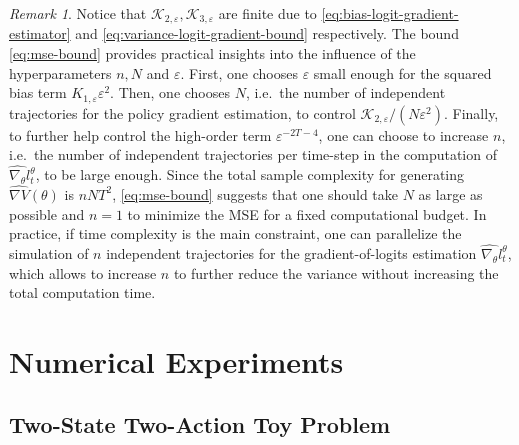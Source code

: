 \documentclass[11pt]{article}
\numberwithin{equation}{section}
\theoremstyle{definition}
\theoremstyle{remark}
\newtheorem{remark}{Remark}[section]
\def\eps{\varepsilon}
\begin{document}
\begin{remark}
    \label{remark:asymptotic-bound-mse}
    Notice that $\mathcal K_{2, \eps}, \mathcal K_{3, \eps}$ are finite due to \eqref{eq:bias-logit-gradient-estimator} and \eqref{eq:variance-logit-gradient-bound} respectively.
    The bound \eqref{eq:mse-bound} provides practical insights into the influence of the hyperparameters $n,N$ and $\eps$.
    First, one chooses $\eps$ small enough for the squared bias term $K_{1, \eps} \eps^2$. 
    Then, one chooses $N$, i.e.\ the number of independent trajectories for the policy gradient estimation, to control $\mathcal K_{2, \eps} / ( N \eps^2 )$. 
    Finally, to further help control the high-order term $\eps^{- 2T - 4}$, one can choose to increase $n$, i.e.\ the number of independent trajectories per time-step in the computation of $\widehat{\nabla_\theta}l_t^\theta$, to be large enough.
    Since the total sample complexity for generating $\widehat{\nabla V}(\theta)$ is $n N T^2$,  \eqref{eq:mse-bound} suggests that one should take $N$ as large as possible and $n=1$ to minimize the MSE for a fixed computational budget. In practice, if time complexity is the main constraint, one can parallelize the simulation of $n$ independent trajectories for the gradient-of-logits estimation $\widehat{\nabla_\theta}l_t^\theta$, which allows to increase $n$ to further reduce the variance without increasing the total computation time.
\end{remark}

\section{Numerical Experiments}
\label{section:numerical-experiments}

\subsection{Two-State Two-Action Toy Problem}
\end{document}
